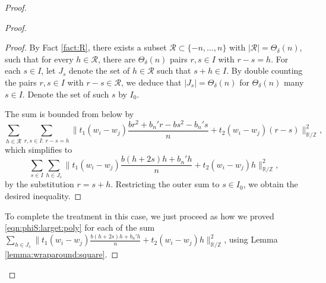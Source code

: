 \documentclass[reqno]{amsart}
\newcommand\R{{\mathbb{R}}}
\newcommand\Z{{\mathbb{Z}}}
\newcommand\CR{{\mathcal R}}
\theoremstyle{plain}
\theoremstyle{definition}
\begin{document}
\begin{proof}
\begin{proof}
\begin{proof}
By Fact \ref{fact:R}, there exists a subset $\CR\subset \{-n,\dots,n\}$ with $|\CR|=\Theta_{\delta}(n)$, such that for every $h \in \CR $, there are $ \Theta_{\delta}(n) $ pairs $r, s\in I$ with $ r - s = h $. For each $s\in I$, let $J_{s}$ denote the set of $h\in \CR$ such that $s+h\in I$. By double counting the pairs $r,s\in I$ with $r-s\in \CR$, we deduce that $|J_{s}|=\Theta_{\delta}(n)$ for $\Theta_{\delta}(n)$ many $s\in I$. Denote the set of such $s$ by $I_{0}$.

The sum is bounded from below by
$$\sum_{h\in \CR}\sum_{r,s \in I: \, r-s=h} \big\| t_{1} (w_{i}-w_{j})\frac{b r^2 + b_{n}' r-b s^2 - b_{n}' s}{n} + t_{2}(w_{i}-w_{j}) (r - s) \big\|_{\R/\Z}^{2},$$
which simplifies to
$$\sum_{s\in I}\sum_{h\in J_{s}} \big\| t_{1} (w_{i}-w_{j})\frac{b (h+2s)h + b_{n}'h}{n} + t_{2}(w_{i}-w_{j})h \big\|_{\R/\Z}^{2},$$
by the substitution $r=s+h$. Restricting the outer sum to $s\in I_{0}$, we obtain the desired inequality.
\end{proof}

To complete the treatment in this case, we just proceed as how we proved \eqref{eqn:phiS:larget:poly} for each of the sum $\sum_{h\in J_{s}} \big\| t_{1} (w_{i}-w_{j})\frac{b (h+2s)h + b_{n}'h}{n} + t_{2}(w_{i}-w_{j})h \big\|_{\R/\Z}^{2}$, using Lemma \ref{lemma:wraparound:square}.

\medskip


\end{proof}
\end{proof}
\end{document}
